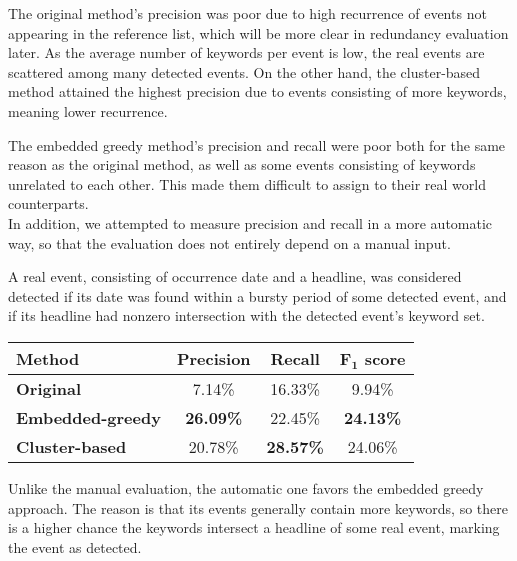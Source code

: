 \hspace{\fill}

The original method's precision was poor due to high recurrence of events not appearing in the reference list, which will be more clear in redundancy evaluation later. As the average number of keywords per event is low, the real events are scattered among many detected events. On the other hand, the cluster-based method attained the highest precision due to events consisting of more keywords, meaning lower recurrence.

The embedded greedy method's precision and recall were poor both for the same reason as the original method, as well as some events consisting of keywords unrelated to each other. This made them difficult to assign to their real world counterparts.\\

In addition, we attempted to measure precision and recall in a more automatic way, so that the evaluation does not entirely depend on a manual input.

A real event, consisting of occurrence date and a headline, was considered detected if its date was found within a bursty period of some detected event, and if its headline had nonzero intersection with the detected event's keyword set.

\hspace{\fill}

\begin{minipage}{\linewidth}
\centering
\begin{tabular}{ l c c c }\toprule[1.5pt]
\bf Method 	 & \bf Precision & \bf Recall & \bf $\mathbf{F_{1}}$ score \\ \midrule
\bf Original &  7.14\%     & 16.33\%     &  9.94\% \\
\bf Embedded-greedy   &  \bf 26.09\%     & 22.45\%      &  \bf 24.13\% \\
\bf Cluster-based &  20.78\%     & \bf 28.57\%      &  24.06\% \\ \bottomrule[1.25pt]
\end {tabular}\par
{} \label{tab:title} 
\end{minipage}

\hspace{\fill}

Unlike the manual evaluation, the automatic one favors the embedded greedy approach. The reason is that its events generally contain more keywords, so there is a higher chance the keywords intersect a headline of some real event, marking the event as detected.

